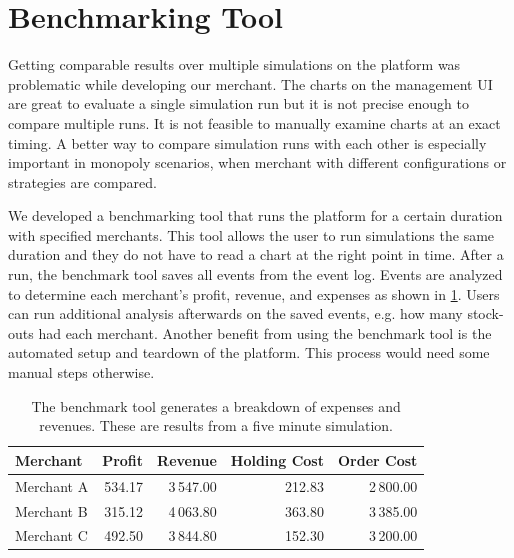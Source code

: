 \section{Benchmarking Tool}
\label{section:benchmark_tool}
Getting comparable results over multiple simulations on the \pricewars platform was problematic while developing our merchant.
The charts on the management UI are great to evaluate a single simulation run but it is not precise enough to compare multiple runs.
It is not feasible to manually examine charts at an exact timing.
A better way to compare simulation runs with each other is especially important in monopoly scenarios, when merchant with different configurations or strategies are compared.

We developed a benchmarking tool that runs the \pricewars platform for a certain duration with specified merchants.
This tool allows the user to run simulations the same duration and they do not have to read a chart at the right point in time.
After a run, the benchmark tool saves all events from the event log.
Events are analyzed to determine each merchant's profit, revenue, and expenses as shown in \cref{tab:benchmark_tool}.
Users can run additional analysis afterwards on the saved events, e.g. how many stock-outs had each merchant.
Another benefit from using the benchmark tool is the automated setup and teardown of the platform.
This process would need some manual steps otherwise.

\begin{table}[t]
\centering
\begin{tabular}{ lrrrr }
	\toprule
	Merchant & Profit & Revenue & Holding Cost & Order Cost \\
	\midrule
	Merchant A & 534.17 & 3\,547.00 & 212.83 & 2\,800.00 \\
	Merchant B & 315.12 & 4\,063.80 & 363.80 & 3\,385.00 \\
	Merchant C & 492.50 & 3\,844.80 & 152.30 & 3\,200.00 \\
	\bottomrule
\end{tabular}
\caption{The benchmark tool generates a breakdown of expenses and revenues. These are results from a five minute simulation.}
\label{tab:benchmark_tool}
\end{table}

